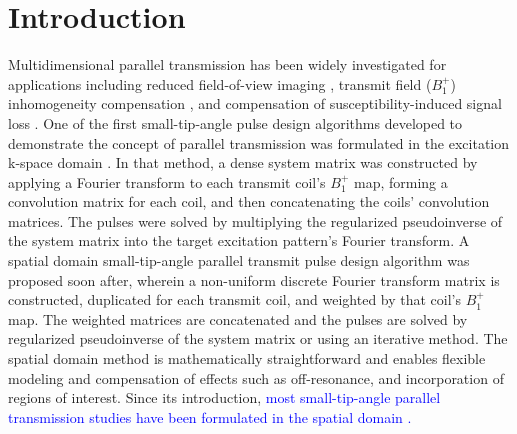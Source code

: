 \section* {Introduction}

\par Multidimensional parallel transmission \cite{Katscher:2003:Magn-Reson-Med:12509830,zhu2004parallel} has been widely investigated for applications including
reduced field-of-view imaging \cite{malik:mrm:2015,mooiweer:2016},
transmit field ($B_1^+$) inhomogeneity compensation \cite{Zhang:2007:Magn-Reson-Med:16526012,cloos:kpstd:2012},
and compensation of susceptibility-induced signal loss \cite{deng:2009}.
One of the first small-tip-angle pulse design algorithms developed to demonstrate the concept of parallel transmission was formulated in the 
excitation k-space domain \cite{Katscher:2003:Magn-Reson-Med:12509830}.
In that method, a dense system matrix was constructed by applying a Fourier transform to each transmit coil's $B_1^+$ map,
forming a convolution matrix for each coil, and then concatenating the coils' convolution matrices.
The pulses were solved by multiplying the 
regularized pseudoinverse of the system matrix into the target excitation pattern's Fourier transform. 
A spatial domain small-tip-angle parallel transmit pulse design algorithm 
\cite{Grissom:2006:MRM} was proposed soon after,
wherein a non-uniform discrete Fourier transform matrix is constructed, 
duplicated for each transmit coil, and weighted by that coil's $B_1^+$ map.
The weighted matrices are concatenated and the pulses are solved by regularized pseudoinverse of the system matrix
or using an iterative method.
% 
The spatial domain method is mathematically straightforward 
and enables flexible modeling and compensation of effects such as off-resonance, 
and incorporation of regions of interest.
Since its introduction, 
\textcolor{blue}{most small-tip-angle parallel transmission studies have been formulated in the spatial domain \cite{padormo:2016,deniz:2019}.} 

